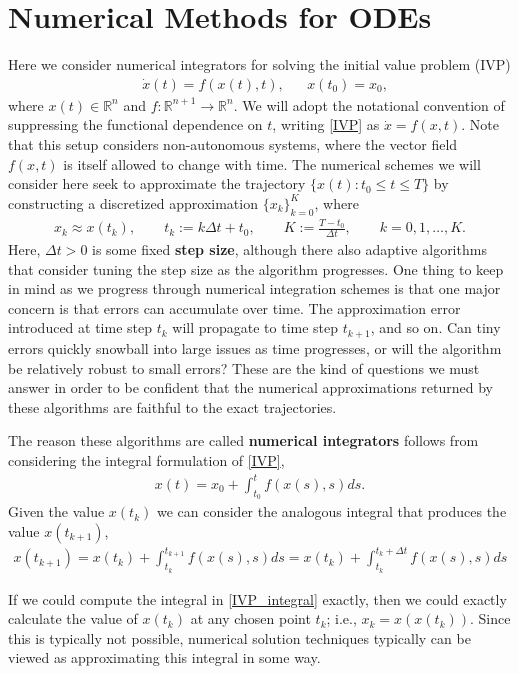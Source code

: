 \documentclass[12pt]{article}
\newcommand{\R}{\mathbb{R}}
\begin{document}
\section{Numerical Methods for ODEs}
Here we consider numerical integrators for solving the initial value problem (IVP) 
\begin{align}
&\dot{x}(t) = f(x(t), t), &&x(t_0) = x_0, \label{IVP}
\end{align}
where $x(t) \in \R^n$ and $f: \R^{n+1} \to \R^n$. We will adopt the notational convention of suppressing the 
functional dependence on $t$, writing \ref{IVP} as $\dot{x} = f(x,t)$. Note that this setup considers non-autonomous 
systems, where the vector field $f(x,t)$ is itself allowed to change with time. The numerical schemes we will consider 
here seek to approximate the trajectory $\{x(t) : t_0 \leq t \leq T\}$ by constructing a discretized approximation 
$\{x_k\}_{k=0}^{K}$, where 
\begin{align}
x_k \approx x(t_k), \qquad t_k := k \Delta t + t_0,  \qquad K := \frac{T-t_0}{\Delta t},  \qquad k = 0, 1, \dots, K.
\end{align}
Here, $\Delta t > 0$ is some fixed \textbf{step size}, although there also adaptive algorithms that consider tuning the step size as the algorithm progresses. 
One thing to keep in mind as we progress through numerical integration schemes is that one major concern is that errors can accumulate 
over time. The approximation error introduced at time step $t_k$ will propagate to time step $t_{k+1}$, and so on. Can tiny errors quickly snowball into 
large issues as time progresses, or will the algorithm be relatively robust to small errors? These are the kind of questions we must answer in 
order to be confident that the numerical approximations returned by these algorithms are faithful to the exact trajectories. 

The reason these algorithms are called \textbf{numerical integrators} follows from considering the integral formulation of \ref{IVP}, 
\begin{align}
x(t) = x_0 + \int_{t_0}^{t} f(x(s), s) ds. 
\end{align}
Given the value $x(t_k)$ we can consider the analogous integral that produces the value $x(t_{k+1})$, 
\begin{align}
x(t_{k+1}) = x(t_k) + \int_{t_k}^{t_{k+1}} f(x(s), s) ds = x(t_k) + \int_{t_k}^{t_k + \Delta t} f(x(s), s) ds \label{IVP_integral}
\end{align}

If we could compute the integral in \ref{IVP_integral} exactly, then we could exactly calculate the value of $x(t_k)$ at any chosen point $t_k$; i.e., 
$x_k = x(x(t_k))$. Since this is typically not possible, numerical solution techniques typically can be viewed as approximating this integral in some way.  
\end{document}
